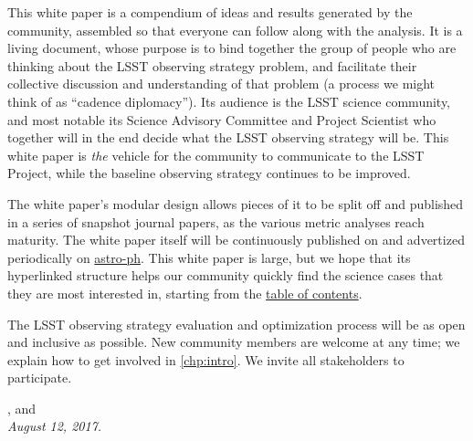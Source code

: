 \noindent This white paper is a compendium of ideas and results
generated by the community, assembled so that everyone can follow along
with the analysis. It is a living document, whose purpose is to bind
together the group of people who are thinking about the LSST observing
strategy problem, and facilitate their collective discussion and
understanding of that problem (a process we might think of as  ``cadence
diplomacy''). Its audience is the LSST science community, and most notable its Science
Advisory Committee and Project Scientist who together will in the end decide what the LSST observing strategy will be. This white paper is {\it
the} vehicle for the community to communicate to the LSST Project, while
the baseline observing strategy continues to be improved.

\noindent The white paper's modular design allows pieces of it to be
split off and published in a series of snapshot journal papers, as the
various metric analyses reach maturity. The white paper itself will be
continuously published on
\href{https://github.com/LSSTScienceCollaborations/ObservingStrategy}{\GitHub}
and advertized periodically on \href{http://arxiv.org}{astro-ph}. This
white paper is large, but we hope that its hyperlinked structure helps
our community quickly find the science cases that they are most interested in,
starting from the \hyperref[toc]{table of contents}.

\noindent The LSST observing strategy evaluation and optimization
process will be as open and inclusive as possible. New community members
are welcome at any time; we explain how to get involved in \autoref{chp:intro}.  We invite all stakeholders to participate.

\vspace{2\baselineskip}

{\raggedleft {},  and  \\
 \medskip \hspace{0.8\linewidth} \it August 12, 2017.}

\clearpage

